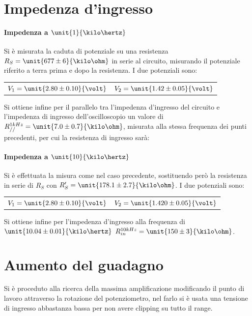 \documentclass[10pt,a4paper]{article}
\begin{document}
\section{Impedenza d'ingresso}

\paragraph{Impedenza a $\unit{1}{\kilo\hertz}$} Si è misurata la caduta di potenziale su una resistenza $R_S = \unit{677 \pm 6}{\kilo\ohm}$ in serie al circuito, misurando il potenziale riferito a terra prima e dopo la resistenza.
I due potenziali sono:
\begin{table}[h!]
	\centering
	\begin{tabular}{cc}
		$V_1 = \unit{2.80 \pm 0.10}{\volt}$  & $V_2 = \unit{1.42 \pm 0.05}{\volt}$
	\end{tabular}
\end{table}

Si ottiene infine per il parallelo tra l'impedenza d'ingresso del circuito e l'impedenza di ingresso dell'oscilloscopio un valore di $R_{//}^{1kHz} = \unit{7.0 \pm 0.7}{\kilo\ohm}$, misurata alla stessa frequenza dei punti precedenti, per cui la resistenza di ingresso sarà: 

\paragraph{Impedenza a $\unit{10}{\kilo\hertz}$}  Si è effettuata la misura come nel caso precedente, sostituendo però la resistenza in serie di $R_S$ con $R_S' = \unit{178.1 \pm 2.7}{\kilo\ohm}$.
I due potenziali sono:
\begin{table}[h!]
	\centering
	\begin{tabular}{cc}
		$V_1 = \unit{2.80 \pm 0.10}{\volt}$  & $V_2 = \unit{1.420 \pm 0.05}{\volt}$
	\end{tabular}
\end{table}

Si ottiene infine per l'impedenza d'ingresso alla frequenza di $\unit{10.04 \pm 0.01}{\kilo\hertz}$ $R_{in}^{10kHz} = \unit{150 \pm 3}{\kilo\ohm}$.

\section{Aumento del guadagno}

Si è proceduto alla ricerca della massima amplificazione modificando il punto di lavoro attraverso la rotazione del potenziometro, nel farlo si è usata una tensione di ingresso abbastanza bassa per non avere clipping su tutto il range.
    
\end{document}
